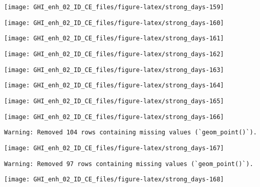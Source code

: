\documentclass[
  10pt,
  a4paper,oneside]{article}
\begin{document}
\begin{center}\texttt{[image: GHI\_enh\_02\_ID\_CE\_files/figure-latex/strong\_days-159]} \end{center}

\begin{center}\texttt{[image: GHI\_enh\_02\_ID\_CE\_files/figure-latex/strong\_days-160]} \end{center}

\begin{center}\texttt{[image: GHI\_enh\_02\_ID\_CE\_files/figure-latex/strong\_days-161]} \end{center}

\begin{center}\texttt{[image: GHI\_enh\_02\_ID\_CE\_files/figure-latex/strong\_days-162]} \end{center}

\begin{center}\texttt{[image: GHI\_enh\_02\_ID\_CE\_files/figure-latex/strong\_days-163]} \end{center}

\begin{center}\texttt{[image: GHI\_enh\_02\_ID\_CE\_files/figure-latex/strong\_days-164]} \end{center}

\begin{center}\texttt{[image: GHI\_enh\_02\_ID\_CE\_files/figure-latex/strong\_days-165]} \end{center}

\begin{center}\texttt{[image: GHI\_enh\_02\_ID\_CE\_files/figure-latex/strong\_days-166]} \end{center}

\begin{verbatim}
Warning: Removed 104 rows containing missing values (`geom_point()`).
\end{verbatim}

\begin{center}\texttt{[image: GHI\_enh\_02\_ID\_CE\_files/figure-latex/strong\_days-167]} \end{center}

\begin{verbatim}
Warning: Removed 97 rows containing missing values (`geom_point()`).
\end{verbatim}

\begin{center}\texttt{[image: GHI\_enh\_02\_ID\_CE\_files/figure-latex/strong\_days-168]} \end{center}
\end{document}
